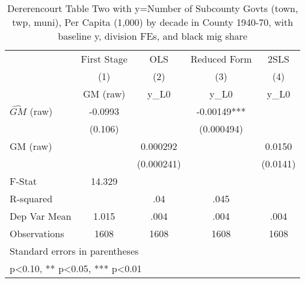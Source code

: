 \begin{table}[htbp]\centering
\def\sym#1{\ifmmode^{#1}\else\(^{#1}\)\fi}
\caption{Dererencourt Table Two with y=Number of Subcounty Govts (town, twp, muni), Per Capita (1,000) by decade in County 1940-70, with baseline y, division FEs, and black mig share}
\begin{tabular}{l*{4}{c}}
\toprule
                    & First Stage   &         OLS   &Reduced Form   &        2SLS   \\
                    &\multicolumn{1}{c}{(1)}&\multicolumn{1}{c}{(2)}&\multicolumn{1}{c}{(3)}&\multicolumn{1}{c}{(4)}\\
                    &\multicolumn{1}{c}{GM  (raw)}&\multicolumn{1}{c}{y\_L0}&\multicolumn{1}{c}{y\_L0}&\multicolumn{1}{c}{y\_L0}\\
\midrule
$\hat{GM}$ (raw)    &     -0.0993   &               &    -0.00149***&               \\
                    &     (0.106)   &               &  (0.000494)   &               \\
\addlinespace
GM  (raw)           &               &    0.000292   &               &      0.0150   \\
                    &               &  (0.000241)   &               &    (0.0141)   \\
\midrule
F-Stat              &      14.329   &               &               &               \\
R-squared           &               &         .04   &        .045   &               \\
Dep Var Mean        &       1.015   &        .004   &        .004   &        .004   \\
Observations        &        1608   &        1608   &        1608   &        1608   \\
\bottomrule
\multicolumn{5}{l}{\footnotesize Standard errors in parentheses}\\
\multicolumn{5}{l}{\footnotesize * p<0.10, ** p<0.05, *** p<0.01}\\
\end{tabular}
\end{table}
